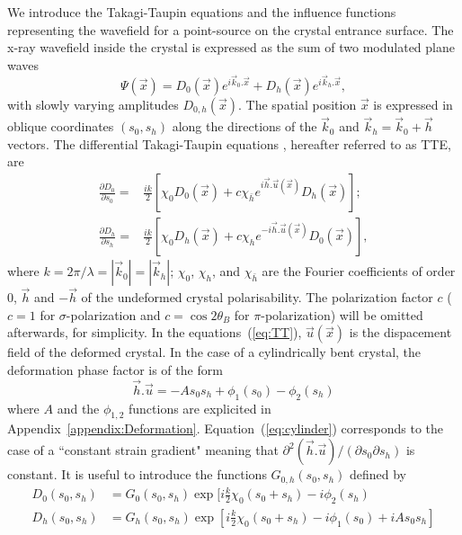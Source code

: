 \documentclass[preprint]{iucr}              %
\begin{document}
We introduce the Takagi-Taupin equations and the influence functions representing the wavefield for a point-source on the crystal entrance surface. The x-ray wavefield inside the crystal is expressed as the sum of two modulated plane waves
\begin{equation}
    \Psi(\vec x) = D_0(\vec x) e^{i \vec k_0 . \vec x} + D_h(\vec x) e^{i \vec k_h . \vec x},
\end{equation}
with slowly varying amplitudes $D_{0,h}(\vec x)$.
The spatial position $\vec x$ is expressed in oblique coordinates $(s_0,s_h)$ along the directions of the $\vec k_0$ and $\vec k_h=\vec k_0 + \vec h$ vectors.
The differential Takagi-Taupin equations  \cite{Takagi1962, Takagi, Taupin, Taupin1967}, hereafter referred to as TTE, are
\begin{subequations}
\label{eq:TT}
\begin{align}
\frac{\partial D_0}{\partial s_0} =& \frac{ik}{2} \left[ \chi_0 D_0(\vec x)+c \chi_{\bar h} e^{i \vec h . \vec u (\vec x)} D_h(\vec x) \right]; \\
\frac{\partial D_h}{\partial s_h} =& \frac{ik}{2} \left[ \chi_0 D_h(\vec x)+c \chi_{h} e^{-i \vec h . \vec u (\vec x)} D_0(\vec x) \right],
\end{align}
\end{subequations}
where $k=2\pi/\lambda=|\vec k_0|=|\vec k_h|$; $\chi_0$, $\chi_h$, and $\chi_{\bar h}$ are the Fourier coefficients of order 0, $\vec h$ and $-\vec h$ of the undeformed crystal polarisability. The polarization factor $c$ ($c=1$ for $\sigma$-polarization and $c=\cos2\theta_B$  for $\pi$-polarization) will be omitted afterwards, for simplicity. 
In the equations~(\ref{eq:TT}), $\vec u (\vec x)$ is the dispacement field of the deformed crystal.
In the case of a cylindrically bent crystal, the deformation phase factor is of the form
\begin{equation}
\label{eq:cylinder}
    \vec h . \vec u = -A s_0 s_h + \phi_1(s_0) - \phi_2(s_h)
\end{equation}
where $A$ and the $\phi_{1,2}$ functions are explicited in Appendix~\ref{appendix:Deformation}.
Equation~(\ref{eq:cylinder}) corresponds to the case of a ``constant strain gradient" \cite{authierbook} meaning that $\partial^2(\vec h . \vec u)/(\partial s_0 \partial s_h)$ is constant.
It is useful to introduce the functions $G_{0,h}(s_0,s_h)$ defined by
  \begin{subequations}
    \label{eq:functionsG}
    \begin{align}
      D_0(s_0,s_h) &= G_0(s_0,s_h) \exp[i\frac{k}{2}\chi_0 (s_0+s_h)-i \phi_2(s_h)\\
      D_h(s_0,s_h) &= G_h(s_0,s_h) \exp[i\frac{k}{2}\chi_0 (s_0+s_h)-i \phi_1(s_0)+iAs_0s_h]
    \end{align}
  \end{subequations}
\end{document}
